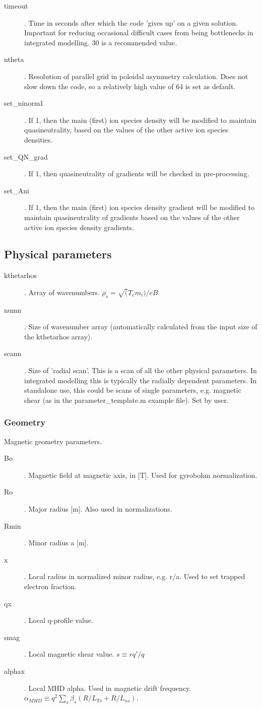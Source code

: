 \documentclass{article}
\begin{document}
\begin{description}
\item[timeout]. Time in seconds after which the code 'gives up' on a given solution. Important for reducing occasional difficult cases from being bottlenecks in integrated modelling. 30 is a recommended value.
\item[ntheta]. Resolution of parallel grid in poloidal asymmetry calculation. Does not slow down the code, so a relatively high value of 64 is set as default.
\item[set\_ninorm1]. If 1, then the main (first) ion species density will be modified to maintain quasineutrality, based on the values of the other active ion species densities.
\item[set\_QN\_grad]. If 1, then quasineutrality of gradients will be checked in pre-processing.
\item[set\_Ani]. If 1, then the main (first) ion species density gradient will be modified to maintain quasineutrality of gradients based on the values of the other active ion species density gradients.
\end{description}

\subsection{Physical parameters}
\begin{description}
\item[kthetarhos]. Array of wavenumbers. $\rho_s=\sqrt(T_em_i)/eB$
\item[numn]. Size of wavenumber array (automatically calculated from the input size of the kthetarhos array).
\item[scann]. Size of 'radial scan'. This is a scan of all the other physical parameters. In integrated modelling this is typically the radially dependent parameters. In standalone use, this could be scans of single parameters, e.g. magnetic shear (as in the parameter\_template.m example file). Set by user.
\end{description}
\subsubsection{Geometry}
Magnetic geometry parameters.
\begin{description}
\item[Bo]. Magnetic field at magnetic axis, in [T]. Used for gyrobohm normalization.
\item[Ro]. Major radius [m]. Also used in normalizations.
\item[Rmin]. Minor radius a [m].
\item[x]. Local radius in normalized minor radius, e.g. r/a. Used to set trapped electron fraction.
\item[qx]. Local q-profile value.
\item[smag]. Local magnetic shear value. $s{\equiv}rq'/q$ 
\item[alphax]. Local MHD alpha. Used in magnetic drift frequency. $\alpha_{MHD}{\equiv}q^2\sum_s\beta_s(R/L_{Ts}+R/L_{ns})$.
\end{description}
\end{document}
